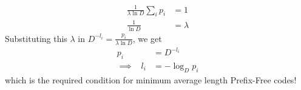 \documentclass{article}
\theoremstyle{definition}
\theoremstyle{remark}
\theoremstyle{definition}
\theoremstyle{definition}
\theoremstyle{definition}
\begin{document}
\begin{enumerate}
{\begin{equation*}
	\begin{split}
		\frac{1}{\lambda \ln D} \sum_{i}p_i &= 1\\
		\frac{1}{\ln D} &= \lambda
	\end{split}
\end{equation*}
Substituting this $ \lambda $ in $ D^{-l_i} = \frac{p_i}{\lambda  \ln D} $, we get
\begin{equation}
	\begin{split}
		p_i &= D^{-l_i}\\
		\implies\;\;\; l_i&= -\log_{D} p_i
	\end{split}
\end{equation}
which is the required condition for minimum average length Prefix-Free codes!
}
\end{enumerate}
\end{document}
